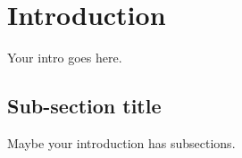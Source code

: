 \section{Introduction}
Your intro goes here.

\subsection{Sub-section title}
Maybe your introduction has subsections.
